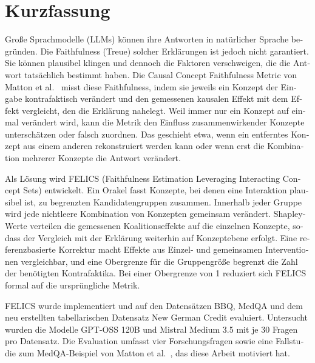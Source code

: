 
\section*{Kurzfassung}

\begin{otherlanguage}{ngerman}
	\begingroup
	\small
	\setlength{\parskip}{0.35em}

	Große Sprachmodelle (LLMs) können ihre Antworten in natürlicher Sprache
	begründen. Die Faithfulness (Treue) solcher Erklärungen ist jedoch nicht
	garantiert. Sie können plausibel klingen und dennoch die Faktoren verschweigen, die die Antwort
	tatsächlich bestimmt haben. Die Causal Concept Faithfulness Metric von Matton
	et al.~\cite{mattonWalkTalkMeasuring2024} misst diese Faithfulness, indem sie jeweils
	ein Konzept der Eingabe kontrafaktisch verändert und den gemessenen kausalen
	Effekt mit dem Effekt vergleicht, den die Erklärung nahelegt. Weil
	immer nur ein Konzept auf einmal verändert wird, kann die Metrik den Einfluss
	zusammenwirkender Konzepte unterschätzen oder falsch zuordnen. Das geschieht
	etwa, wenn ein entferntes Konzept aus einem anderen rekonstruiert werden kann
	oder wenn erst die Kombination mehrerer Konzepte die Antwort verändert.

	Als Lösung wird FELICS (Faithfulness Estimation Leveraging Interacting Concept
	Sets) entwickelt. Ein Orakel fasst Konzepte, bei denen eine Interaktion
	plausibel ist, zu begrenzten Kandidatengruppen zusammen. Innerhalb jeder Gruppe
	wird jede nichtleere Kombination von Konzepten gemeinsam verändert.
	Shapley-Werte verteilen die gemessenen Koalitionseffekte auf die einzelnen
	Konzepte, sodass der Vergleich mit der Erklärung weiterhin auf Konzeptebene
	erfolgt. Eine referenzbasierte Korrektur macht Effekte aus Einzel- und
	gemeinsamen Interventionen vergleichbar, und eine Obergrenze für die
	Gruppengröße begrenzt die Zahl der benötigten Kontrafaktika. Bei einer
	Obergrenze von 1 reduziert sich FELICS formal auf die ursprüngliche Metrik.

	FELICS wurde implementiert und auf den Datensätzen BBQ, MedQA und dem neu
	erstellten tabellarischen Datensatz New German Credit evaluiert. Untersucht
	wurden die Modelle GPT-OSS 120B und Mistral Medium 3.5 mit je 30 Fragen pro
	Datensatz. Die Evaluation umfasst vier Forschungsfragen sowie eine Fallstudie
	zum MedQA-Beispiel von Matton
	et al.~\cite{mattonWalkTalkMeasuring2024}, das diese Arbeit motiviert hat.


\end{otherlanguage}
